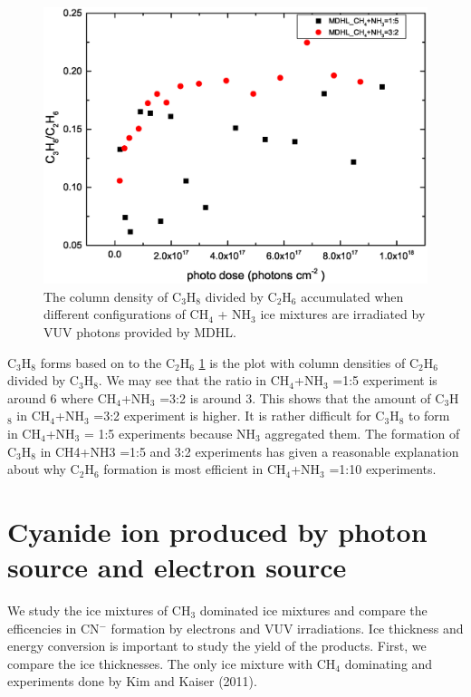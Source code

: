 \begin{figure}
\centering
\includegraphics[width=\textwidth]{figures/chapter3/Lab_C3H8_C2H6.eps}
\caption{The column density of C$_3$H$_8$ divided by C$_2$H$_6$ accumulated when different configurations of CH$_4$ + NH$_3$ ice mixtures are irradiated by VUV photons provided by MDHL.}
\label{fig:C2H6_C3H8}
\end{figure}

C$_3$H$_8$ forms based on to the C$_2$H$_6$ \ref{fig:C2H6_C3H8} is the plot with column densities of C$_2$H$_6$ divided by C$_3$H$_8$. We may see that the ratio in CH$_4$+NH$_3$ =1:5 experiment is around 6 where CH$_4$+NH$_3$ =3:2 is around 3. This shows that the amount of C$_3$H$_8$ in CH$_4$+NH$_3$ =3:2 experiment is higher. It is rather difficult for C$_3$H$_8$ to form in CH$_4$+NH$_3$ = 1:5 experiments because NH$_3$ aggregated them. The formation of C$_3$H$_8$ in CH4+NH3 =1:5 and 3:2 experiments has given a reasonable explanation about why C$_2$H$_6$ formation is most efficient in CH$_4$+NH$_3$ =1:10 experiments.

\section{Cyanide ion produced by photon source and electron source}

We study the ice mixtures of CH$_3$ dominated ice mixtures and compare the efficencies in CN$^-$ formation by electrons and VUV irradiations.  Ice thickness and energy conversion is important to study the yield of the products. First, we compare the ice thicknesses. The only ice mixture with CH$_4$ dominating  and experiments done by Kim and Kaiser (2011)\cite{kim}.

